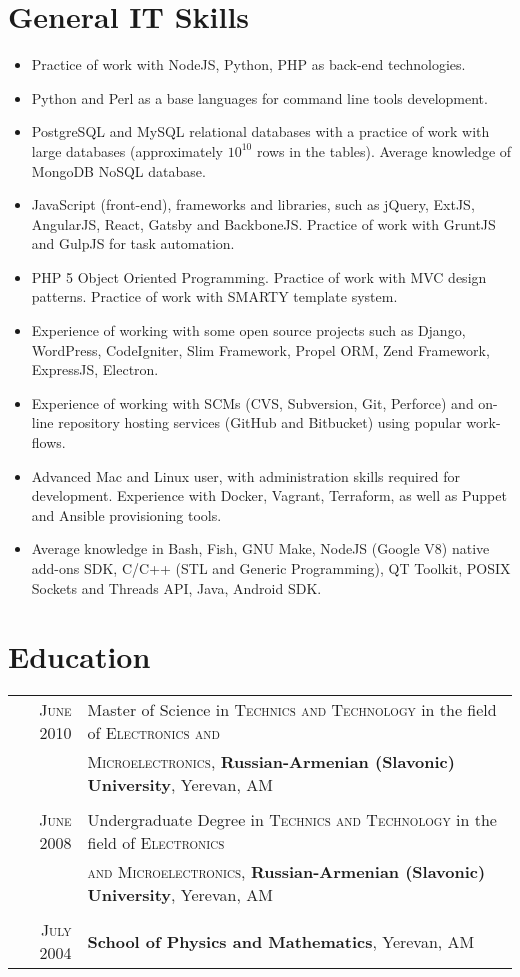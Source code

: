 \documentclass[a4paper,10pt]{article}
\begin{document}
\section{General IT Skills}
\begin{itemize}
  \item[] Practice of work with NodeJS, Python, PHP as back-end technologies.
  \item[] Python and Perl as a base languages for command line tools
          development.
  \item[] PostgreSQL and MySQL relational databases with a practice of work
          with large databases (approximately $10^{10}$ rows in the tables).
          Average knowledge of MongoDB NoSQL database.
  \item[] JavaScript (front-end), frameworks and libraries, such as jQuery,
          ExtJS, AngularJS, React, Gatsby and BackboneJS. Practice of work with GruntJS and GulpJS for task automation.
  \item[] PHP 5 Object Oriented Programming. Practice of work with MVC design
          patterns. Practice of work with SMARTY template system.
  \item[] Experience of working with some open source projects such as Django,
          WordPress, CodeIgniter, Slim Framework, Propel ORM, Zend Framework,
          ExpressJS, Electron.
  \item[] Experience of working with SCMs (CVS, Subversion, Git, Perforce) and
          on-line repository hosting services (GitHub and Bitbucket) using
          popular work-flows.
  \item[] Advanced Mac and Linux user, with administration skills required for
          development. Experience with Docker, Vagrant, Terraform, as well as
          Puppet and Ansible provisioning tools.
  \item[] Average knowledge in Bash, Fish, GNU Make, NodeJS (Google V8) native
          add-ons SDK, C/C++ (STL and Generic Programming), QT Toolkit, POSIX
          Sockets and Threads API, Java, Android SDK.
\end{itemize}


\section{Education}
\begin{tabular}{rl}
  \textsc{June} 2010
    & Master of Science in \textsc{Technics and Technology}
      in the field of \textsc{Electronics and} \\ & \textsc{Microelectronics},
    \textbf{Russian-Armenian (Slavonic) University}, Yerevan, AM \\
  & \\
  \textsc{June} 2008
    & Undergraduate Degree in \textsc{Technics and Technology}
      in the field of \textsc{Electronics} \\ & \textsc{and Microelectronics},
    \textbf{Russian-Armenian (Slavonic) University}, Yerevan, AM \\
  & \\
  \textsc{July} 2004
  & \textbf{School of Physics and Mathematics}, Yerevan, AM
\end{tabular}
\end{document}
